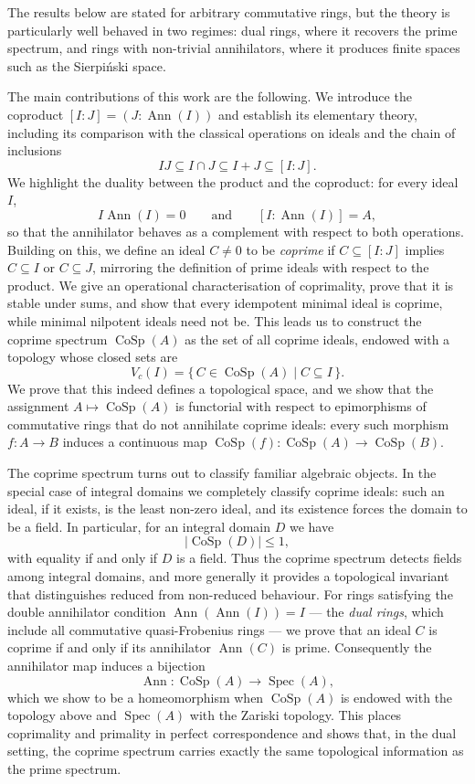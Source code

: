 \documentclass{amsart}
\DeclareMathOperator{\ann}{Ann}
\begin{document}
The results below are stated for arbitrary commutative rings, but the theory is particularly well behaved in two regimes: dual rings, where it recovers the prime spectrum, and rings with non-trivial annihilators, where it produces finite spaces such as the Sierpi\'nski space.

The main contributions of this work are the following. We introduce the coproduct $[I:J]=(J:\ann(I))$ and establish its elementary theory, including its comparison with the classical operations on ideals and the chain of inclusions
\[
IJ\subseteq I\cap J\subseteq I+J\subseteq [I:J].
\]
We highlight the duality between the product and the coproduct: for every ideal $I$,
\[
I\ann(I)=0 \qquad\text{and}\qquad [I:\ann(I)]=A,
\]
so that the annihilator behaves as a complement with respect to both operations. Building on this, we define an ideal $C\neq 0$ to be \emph{coprime} if $C\subseteq [I:J]$ implies $C\subseteq I$ or $C\subseteq J$, mirroring the definition of prime ideals with respect to the product. We give an operational characterisation of coprimality, prove that it is stable under sums, and show that every idempotent minimal ideal is coprime, while minimal nilpotent ideals need not be. This leads us to construct the coprime spectrum $\operatorname{CoSp}(A)$ as the set of all coprime ideals, endowed with a topology whose closed sets are
\[
V_c(I)=\{\,C\in\operatorname{CoSp}(A)\mid C\subseteq I\,\}.
\]
We prove that this indeed defines a topological space, and we show that the assignment $A\mapsto \operatorname{CoSp}(A)$ is functorial with respect to epimorphisms of commutative rings that do not annihilate coprime ideals: every such morphism $f\colon A\to B$ induces a continuous map $\operatorname{CoSp}(f)\colon \operatorname{CoSp}(A)\to \operatorname{CoSp}(B)$.

The coprime spectrum turns out to classify familiar algebraic objects. In the special case of integral domains we completely classify coprime ideals: such an ideal, if it exists, is the least non-zero ideal, and its existence forces the domain to be a field. In particular, for an integral domain $D$ we have
\[
|\operatorname{CoSp}(D)|\le 1,
\]
with equality if and only if $D$ is a field. Thus the coprime spectrum detects fields among integral domains, and more generally it provides a topological invariant that distinguishes reduced from non-reduced behaviour. For rings satisfying the double annihilator condition $\ann(\ann(I))=I$ --- the \emph{dual rings}, which include all commutative quasi-Frobenius rings --- we prove that an ideal $C$ is coprime if and only if its annihilator $\ann(C)$ is prime. Consequently the annihilator map induces a bijection
\[
\ann\colon \operatorname{CoSp}(A)\longrightarrow \operatorname{Spec}(A),
\]
which we show to be a homeomorphism when $\operatorname{CoSp}(A)$ is endowed with the topology above and $\operatorname{Spec}(A)$ with the Zariski topology. This places coprimality and primality in perfect correspondence and shows that, in the dual setting, the coprime spectrum carries exactly the same topological information as the prime spectrum.
\end{document}
